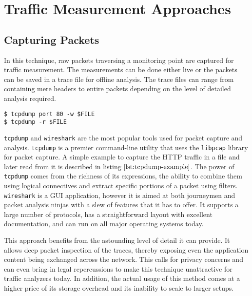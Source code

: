 \chapter{Traffic Measurement Approaches}\label{ch:traffic-measurement-approaches}

\section{Capturing Packets}\label{sec:capturing-packets}
In this technique, raw packets traversing a monitoring point are captured for traffic measurement. The measurements can be done either live or the packets can be saved in a trace file for offline analysis. The trace files can range from containing mere headers to entire packets depending on the level of detailed analysis required. 

\begin{lstlisting}
$ tcpdump port 80 -w $FILE
$ tcpdump -r $FILE
\end{lstlisting}

\texttt{tcpdump} and \texttt{wireshark} are the most popular tools used for packet capture and analysis. \texttt{tcpdump} \cite{tcpdump-manpage} is a premier command-line utility that uses the \texttt{libpcap} \cite{pcap-manpage} library for packet capture. A simple example to capture the \ac{HTTP} traffic in a file and later read from it is described in listing $\ref{lst:tcpdump-example}$.  The power of \texttt{tcpdump}  comes from the richness of its expressions, the ability to combine them using logical connectives and extract specific portions of a packet using filters. \texttt{wireshark} \cite{wireshark-manpage} is a \ac{GUI} application, however it is aimed at both journeymen and packet analysis ninjas with a slew of features that it has to offer.  It supports a large number of protocols, has a straightforward layout with excellent documentation, and can run on all major operating systems today. 

This approach benefits from the astounding level of detail it can provide. It allows deep packet inspection of the traces, thereby exposing even the application content being exchanged  across the network. This calls for privacy concerns and can even bring in legal repercussions to make this technique unattractive for traffic analyzers today. In addition, the actual usage of this method comes at a higher price of its storage overhead and its inability to scale to larger setups.

